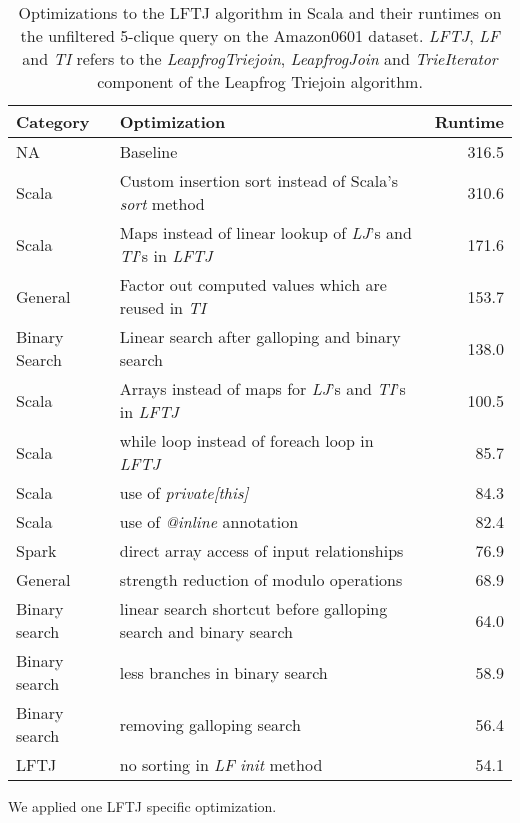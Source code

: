 \begin{table}
    \begin{tabular}{llr}
        \toprule
        Category & Optimization & Runtime \\ \midrule
        NA & Baseline     & 316.5   \\
        Scala & Custom insertion sort instead of Scala's \textit{sort} method & 310.6 \\
        Scala & Maps instead of linear lookup of \textit{LJ}'s and \textit{TI}'s in \textit{LFTJ} & 171.6 \\
        General & Factor out computed values which are reused in \textit{TI} & 153.7 \\
        Binary Search & Linear search after galloping and binary search & 138.0 \\
        Scala & Arrays instead of maps for \textit{LJ}'s and \textit{TI}'s in \textit{LFTJ} & 100.5 \\
        Scala & while loop instead of foreach loop in \textit{LFTJ} & 85.7 \\
        Scala & use of \textit{private[this]}                     & 84.3 \\
        Scala & use of \textit{@inline} annotation                & 82.4 \\
        Spark & direct array access of input relationships       & 76.9 \\
        General & strength reduction of modulo operations           & 68.9 \\
        Binary search & linear search shortcut before galloping search and binary search & 64.0 \\
        Binary search & less branches in binary search & 58.9 \\
        Binary search & removing galloping search      & 56.4 \\
        LFTJ          & no sorting in \textit{LF} \textit{init} method &  54.1 \\
        \bottomrule
    \end{tabular}
    \caption{Optimizations to the \textsc{LFTJ} algorithm in Scala and their runtimes on the unfiltered 5-clique query on
    the Amazon0601 dataset.
    \textit{LFTJ}, \textit{LF} and \textit{TI} refers to the \textit{LeapfrogTriejoin}, \textit{LeapfrogJoin}
    and \textit{TrieIterator} component of the Leapfrog Triejoin algorithm.
    }
    \label{table:lftj-optimizations}
\end{table}

We applied one \textsc{LFTJ} specific optimization.

